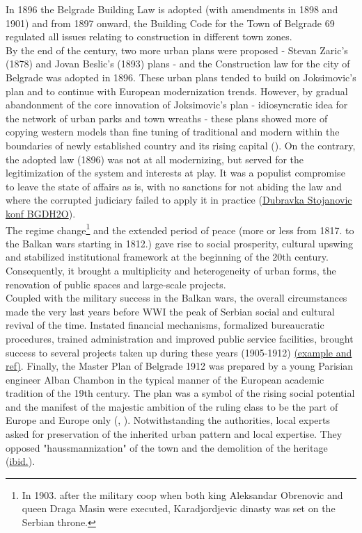 \documentclass[11pt]{report}
\begin{document}
In 1896 the Belgrade Building Law is adopted (with amendments in 1898 and 1901) and from 1897 onward, the Building Code for the Town of Belgrade 69 regulated all issues relating to construction in different town zones.
\\

By the end of the century, two more urban plans were proposed - Stevan Zaric's (1878) and Jovan Beslic's (1893) plans - and the Construction law for the city of Belgrade was adopted in 1896. These urban plans tended to build on Joksimovic's plan and to continue with European modernization trends.
However, by gradual abandonment of the core innovation of Joksimovic's plan - idiosyncratic idea for the network of urban parks and town wreaths - these plans showed more of copying western models than fine tuning of traditional and modern within the boundaries of newly established country and its rising capital (\href{ref}{\citealt{blagojevic_urban_2009}}). On the contrary, the adopted law (1896) was not at all modernizing, but served for the legitimization of the system and interests at play.
It was a populist compromise to leave the state of affairs as is, with no sanctions for not abiding the law and where the corrupted judiciary failed to apply it in practice (\href{ref}{Dubravka Stojanovic konf BGDH2O}). 
\\

The regime change\footnote{In 1903. after the military coop when both king Aleksandar Obrenovic and queen Draga Masin were executed, Karadjordjevic dinasty was set on the Serbian throne.}
and the extended period of peace (more or less from 1817. to the Balkan wars starting in 1812.) gave rise to social prosperity, cultural upswing and stabilized institutional framework at the beginning of the 20th century. Consequently, it brought a multiplicity and heterogeneity of urban forms, the renovation of public spaces and large-scale projects.
\\

Coupled with the military success in the Balkan wars, the overall circumstances made the very last years before  WWI the peak of Serbian social and cultural revival of the time.
Instated financial mechanisms, formalized bureaucratic procedures, trained administration and improved public service facilities, brought success to several projects taken up during these years (1905-1912) \href{ref}{(example and ref)}.
Finally, the Master Plan of  Belgrade 1912 was prepared by a young Parisian engineer Alban Chambon in the typical manner of the European academic tradition of the 19th century.
The plan was a symbol of the rising social potential and the manifest of the majestic ambition of the ruling class to be the part of Europe and Europe only 
(\href{ref}{\citealt{blagojevic_urban_2009}}, \href{ref}{\citealt{doytchinov_modernization_2015}}).
Notwithstanding the authorities, local experts asked for preservation of the inherited urban pattern and local expertise. They opposed "haussmannization" of the town and the demolition of the heritage (\href{ref}{ibid.}).
\\
\end{document}

